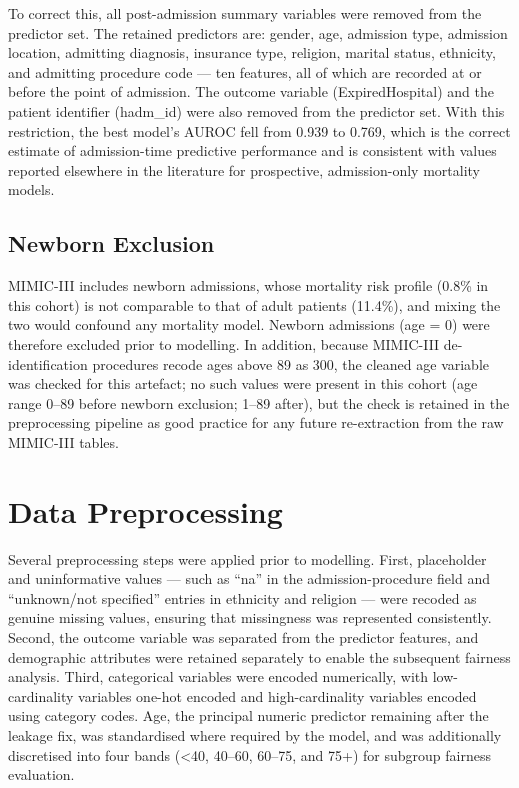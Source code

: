 \documentclass[12pt,a4paper]{report}
\begin{document}
To correct this, all post-admission summary variables were removed from the predictor set. The retained predictors are: gender, age, admission type, admission location, admitting diagnosis, insurance type, religion, marital status, ethnicity, and admitting procedure code --- ten features, all of which are recorded at or before the point of admission. The outcome variable (ExpiredHospital) and the patient identifier (hadm\_id) were also removed from the predictor set. With this restriction, the best model's AUROC fell from 0.939 to 0.769, which is the correct estimate of admission-time predictive performance and is consistent with values reported elsewhere in the literature for prospective, admission-only mortality models.

\subsection{Newborn Exclusion}
\label{sec:newborn-fix}
MIMIC-III includes newborn admissions, whose mortality risk profile (0.8\% in this cohort) is not comparable to that of adult patients (11.4\%), and mixing the two would confound any mortality model. Newborn admissions (age = 0) were therefore excluded prior to modelling. In addition, because MIMIC-III de-identification procedures recode ages above 89 as 300, the cleaned age variable was checked for this artefact; no such values were present in this cohort (age range 0--89 before newborn exclusion; 1--89 after), but the check is retained in the preprocessing pipeline as good practice for any future re-extraction from the raw MIMIC-III tables.


\section{Data Preprocessing}
Several preprocessing steps were applied prior to modelling. First, placeholder and uninformative values --- such as ``na'' in the admission-procedure field and ``unknown/not specified'' entries in ethnicity and religion --- were recoded as genuine missing values, ensuring that missingness was represented consistently. Second, the outcome variable was separated from the predictor features, and demographic attributes were retained separately to enable the subsequent fairness analysis. Third, categorical variables were encoded numerically, with low-cardinality variables one-hot encoded and high-cardinality variables encoded using category codes. Age, the principal numeric predictor remaining after the leakage fix, was standardised where required by the model, and was additionally discretised into four bands (\textless 40, 40--60, 60--75, and 75+) for subgroup fairness evaluation.
\end{document}
